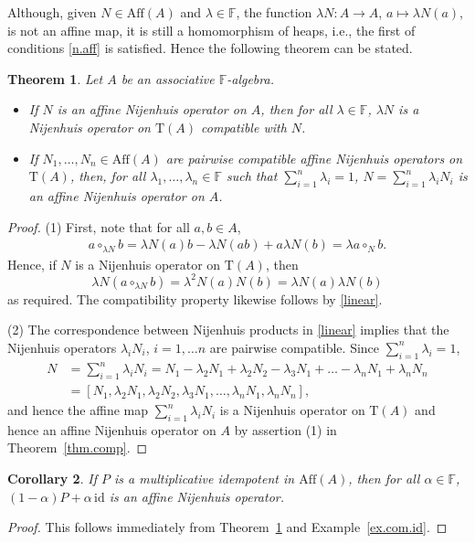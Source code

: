 \documentclass[pdftex]{sigma}
\numberwithin{equation}{section}
\newtheorem{Theorem}{Theorem}[section]
\newtheorem{Corollary}[Theorem]{Corollary}
\newcommand{\F}{\mathbb F}
\newcommand{\id}{\mathrm{id}}
\begin{document}
Although, given $N\in \mathrm{Aff}(A)$ and $\lambda \in \F$, the function $\lambda N\colon A\to A$, $a\mapsto \lambda N(a)$, is not an affine map, it is still a homomorphism of heaps, i.e., the first of conditions \eqref{n.aff} is satisfied. Hence the following theorem can be stated.

\begin{Theorem}\label{thm.affine}
Let $A$ be an associative $\F$-algebra.
\begin{itemize}
 \item[$(1)$] If $N$ is an affine Nijenhuis operator on $A$, then for all $\lambda \in \F$, $\lambda N$ is a Nijenhuis operator on $\mathrm{T}(A)$ compatible with $N$.
\item[$(2)$] If $N_1,\dots , N_n\in \mathrm{Aff}(A)$ are pairwise compatible affine Nijenhuis operators on $\mathrm{T}(A)$, then, for all $\lambda_1,\dots, \lambda_n\in \F$ such that $\sum_{i=1}^n\lambda_i =1$,
 $N = \sum_{i=1}^n \lambda_i N_i $
 is an affine Nijenhuis operator on $A$.
\end{itemize}
\end{Theorem}
\begin{proof}
 (1) First, note that for all $a,b\in A$,
 \begin{align}\label{linear}
 a\circ_{\lambda N}b = \lambda N(a)b - \lambda N(ab) + a\lambda N(b) = \lambda a\circ _N b.
 \end{align}
 Hence, if $N$ is a Nijenhuis operator on $\mathrm{T}(A)$, then
 \[
 \lambda N(a\circ_{\lambda N}b) = \lambda^2 N(a)N(b) = \lambda N(a)\lambda N(b)
 \]
 as required.
The compatibility property likewise follows by \eqref{linear}.

(2) The correspondence between Nijenhuis products in \eqref{linear} implies that the Nijenhuis operators $\lambda_iN_i$, $i=1,\dots n$ are pairwise compatible. Since $\sum_{i=1}^n\lambda_i =1$,
\begin{align*}
 N &= \sum_{i=1}^n \lambda_i N_i = N_1 - \lambda_2 N_1 + \lambda_2 N_2 - \lambda_3 N_1 + \dots - \lambda_{n} N_1 + \lambda_{n}N_{n}\\
 &= [N_1 ,\lambda_2 N_1 , \lambda_2 N_2 , \lambda_3 N_1 , \dots , \lambda_{n} N_1 , \lambda_{n}N_{n}],
\end{align*}
and hence the affine map $\sum_{i=1}^n \lambda_i N_i$ is a Nijenhuis operator on $\mathrm{T}(A)$ and hence an affine Nijenhuis operator on $A$ by assertion (1) in Theorem~\ref{thm.comp}.
\end{proof}

\begin{Corollary}\label{cor.aff.nij.op}
 If $P$ is a multiplicative idempotent in $\mathrm{Aff}(A)$, then for all $\alpha\in \F$, $(1-\alpha)P + \alpha\, \id$ is an affine Nijenhuis operator.
\end{Corollary}
\begin{proof}
 This follows immediately from Theorem~\ref{thm.affine} and Example~\ref{ex.com.id}.
\end{proof}
\end{document}
